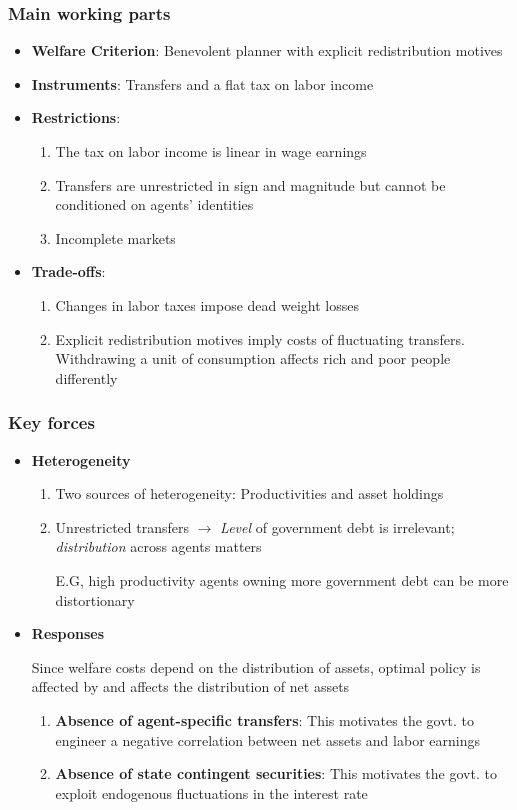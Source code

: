 \documentclass{beamer}
\begin{document}
\begin{frame}
 \frametitle{Main working parts}
\begin{itemize}
 \item \textbf{Welfare Criterion}: Benevolent planner with explicit redistribution motives
 \item \textbf{Instruments}: Transfers and a flat tax on labor income
 \item \textbf{Restrictions}:
 \begin{enumerate}
  \item The tax on labor income is linear in wage earnings
  \item Transfers are unrestricted in sign and magnitude  but cannot be  conditioned on agents' identities
  \item Incomplete markets
 \end{enumerate}
\item \textbf{Trade-offs}:
\begin{enumerate}
\item Changes in labor taxes impose dead weight losses
\item Explicit redistribution motives imply costs of fluctuating transfers. Withdrawing a unit of consumption affects rich and poor people differently
\end{enumerate}
\end{itemize}
\end{frame}
\begin{frame}
 \frametitle{Key forces }
 \begin{itemize}
  \item \textbf{Heterogeneity}
  \begin{enumerate}
  \item Two sources of heterogeneity: Productivities and asset holdings
   \item Unrestricted transfers $\rightarrow$ \emph{Level }of government debt is irrelevant; \emph{distribution} across agents matters

  E.G, high productivity agents owning more government debt can be more distortionary
  \end{enumerate}
  \item \textbf{Responses}

  Since welfare costs depend on the distribution of assets, optimal policy is affected by and affects the distribution of net assets
\begin{enumerate}
\item \textbf{Absence of agent-specific transfers}: This motivates  the govt. to engineer  a negative correlation between net assets and labor earnings
\item \textbf{Absence of state contingent securities}: This motivates the govt. to exploit endogenous fluctuations in the interest rate

 \end{enumerate}
\end{itemize}

\end{frame}
\end{document}
